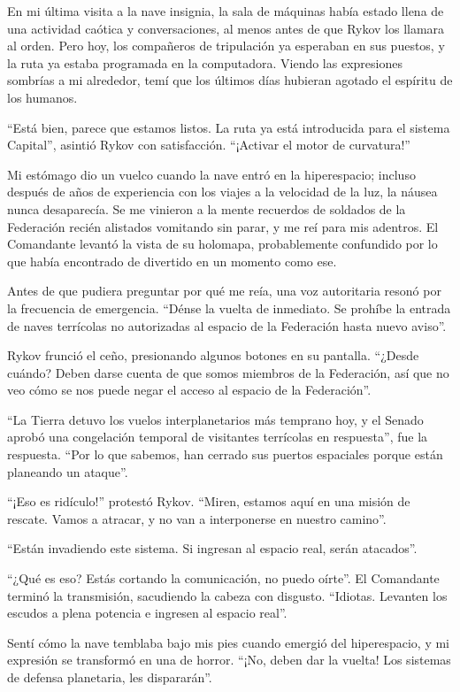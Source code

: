 \documentclass[spanish,12pt,a4paper,oneside,titlepage]{book}
\begin{document}
    En mi última visita a la nave insignia, la sala de máquinas había estado llena de una actividad caótica y conversaciones, al menos antes de que Rykov los llamara al orden. Pero hoy, los compañeros de tripulación ya esperaban en sus puestos, y la ruta ya estaba programada en la computadora. Viendo las expresiones sombrías a mi alrededor, temí que los últimos días hubieran agotado el espíritu de los humanos.

    ``Está bien, parece que estamos listos. La ruta ya está introducida para el sistema Capital'', asintió Rykov con satisfacción. ``¡Activar el motor de curvatura!''

    Mi estómago dio un vuelco cuando la nave entró en la hiperespacio; incluso después de años de experiencia con los viajes a la velocidad de la luz, la náusea nunca desaparecía. Se me vinieron a la mente recuerdos de soldados de la Federación recién alistados vomitando sin parar, y me reí para mis adentros. El Comandante levantó la vista de su holomapa, probablemente confundido por lo que había encontrado de divertido en un momento como ese.

    Antes de que pudiera preguntar por qué me reía, una voz autoritaria resonó por la frecuencia de emergencia. ``Dénse la vuelta de inmediato. Se prohíbe la entrada de naves terrícolas no autorizadas al espacio de la Federación hasta nuevo aviso''.

    Rykov frunció el ceño, presionando algunos botones en su pantalla. ``¿Desde cuándo? Deben darse cuenta de que somos miembros de la Federación, así que no veo cómo se nos puede negar el acceso al espacio de la Federación''.

    ``La Tierra detuvo los vuelos interplanetarios más temprano hoy, y el Senado aprobó una congelación temporal de visitantes terrícolas en respuesta'', fue la respuesta. ``Por lo que sabemos, han cerrado sus puertos espaciales porque están planeando un ataque''.

    ``¡Eso es ridículo!'' protestó Rykov. ``Miren, estamos aquí en una misión de rescate. Vamos a atracar, y no van a interponerse en nuestro camino''.

    ``Están invadiendo este sistema. Si ingresan al espacio real, serán atacados''.

    ``¿Qué es eso? Estás cortando la comunicación, no puedo oírte''. El Comandante terminó la transmisión, sacudiendo la cabeza con disgusto. ``Idiotas. Levanten los escudos a plena potencia e ingresen al espacio real''.

    Sentí cómo la nave temblaba bajo mis pies cuando emergió del hiperespacio, y mi expresión se transformó en una de horror. ``¡No, deben dar la vuelta! Los sistemas de defensa planetaria, les dispararán''.
\end{document}
